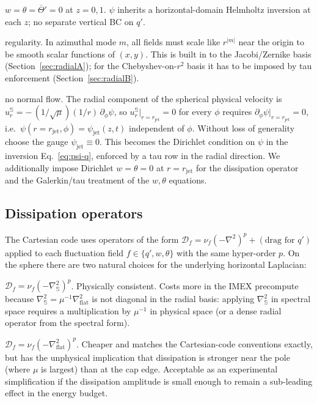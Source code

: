 \documentclass[11pt]{article}
\newcommand{\Lap}{\nabla^2}
\newcommand{\Lapproj}{\nabla^2_{\!\mathrm{flat}}}
\newcommand{\Lapsphere}{\nabla^2_{\!\mathbb{S}}}
\newcommand{\rjet}{r_{\mathrm{jet}}}
\begin{document}
\begin{description}[leftmargin=2em,style=nextline]
  \item[Vertical:] $w = \theta = \overline{\Theta}' = 0$ at $z = 0, 1$.
  $\psi$ inherits a horizontal-domain Helmholtz inversion at each $z$;
  no separate vertical BC on $q'$.
  \item[Pole, $r=0$:] regularity.  In azimuthal mode $m$, all fields
  must scale like $r^{|m|}$ near the origin to be smooth scalar
  functions of $(x,y)$.  This is built in to the Jacobi/Zernike basis
  (Section~\ref{sec:radialA}); for the Chebyshev-on-$r^{2}$ basis it
  has to be imposed by tau enforcement (Section~\ref{sec:radialB}).
  \item[Jet, $r=\rjet$:] no normal flow.  The radial component of the
  spherical physical velocity is
  $u_{r}^{\mathbb{S}} = -\,(1/\sqrt{\mu})(1/r)\,\partial_{\phi}\psi$,
  so $u_{r}^{\mathbb{S}}|_{r=\rjet} = 0$ for every $\phi$ requires
  $\partial_{\phi}\psi|_{r=\rjet} = 0$, i.e.\ $\psi(r=\rjet, \phi) =
  \psi_{\mathrm{jet}}(z, t)$ independent of $\phi$.  Without loss of
  generality choose the gauge $\psi_{\mathrm{jet}} \equiv 0$.  This
  becomes the Dirichlet condition on $\psi$ in the inversion
  Eq.~\eqref{eq:psi-q}, enforced by a tau row in the radial direction.
  We additionally impose Dirichlet $w = \theta = 0$ at $r = \rjet$
  for the dissipation operator and the Galerkin/tau treatment of the
  $w,\theta$ equations.
\end{description}

\subsection{Dissipation operators}
\label{sec:dissipation}

The Cartesian code uses operators of the form
$\mathcal{D}_{f} = \nu_{f}(-\Lap)^{p} + (\text{drag for }q')$
applied to each fluctuation field $f \in \{q', w, \theta\}$ with the
same hyper-order $p$.  On the sphere there are two natural choices
for the underlying horizontal Laplacian:

\begin{description}[leftmargin=2em,style=nextline]
  \item[Spherical-Laplacian dissipation:]
  $\mathcal{D}_{f} = \nu_{f}(-\Lapsphere)^{p}$.  Physically consistent.
  Costs more in the IMEX precompute because $\Lapsphere = \mu^{-1}
  \Lapproj$ is not diagonal in the radial basis: applying $\Lapsphere$
  in spectral space requires a multiplication by $\mu^{-1}$ in physical
  space (or a dense radial operator from the spectral form).
  \item[Flat-disk Laplacian dissipation:]
  $\mathcal{D}_{f} = \nu_{f}(-\Lapproj)^{p}$.  Cheaper and matches the
  Cartesian-code conventions exactly, but has the unphysical implication
  that dissipation is stronger near the pole (where $\mu$ is largest)
  than at the cap edge.  Acceptable as an experimental simplification
  if the dissipation amplitude is small enough to remain a sub-leading
  effect in the energy budget.
\end{description}
\end{document}

